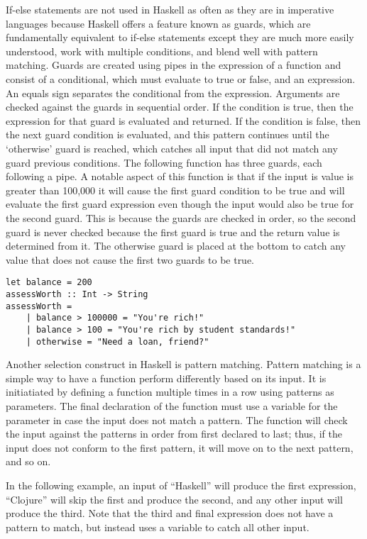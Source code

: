 \documentclass[titlepage,12pt]{article}
\begin{document}
If-else statements are not used in Haskell as often as they are in imperative languages because Haskell offers a feature 
known as guards, which are fundamentally equivalent to if-else statements except they are much more easily understood, 
work with multiple conditions, and blend well with pattern matching. Guards are created using pipes in the 
expression of a function and consist of a conditional, which must evaluate to true or false, and an expression. 
An equals sign separates the conditional from the expression. Arguments are checked against the guards in 
sequential order. If the condition is true, then the expression for that guard is evaluated and returned. 
If the condition is false, then the next guard condition is evaluated, and this pattern continues until the 
`otherwise' guard is reached, which catches all input that did not match any guard previous conditions. The 
following function has three guards, each following a pipe. A notable aspect of this function is that if the 
input is value is greater than 100,000 it will cause the first guard condition to be true and will evaluate the 
first guard expression even though the input would also be true for the second guard. This is because the guards are 
checked in order, so the second guard is never checked because the first guard is true and the return value is 
determined from it. The otherwise guard is placed at the bottom to catch any value that does not cause the first two guards to be true. 

\begin{verbatim}
let balance = 200
assessWorth :: Int -> String
assessWorth =
    | balance > 100000 = "You're rich!"
    | balance > 100 = "You're rich by student standards!"
    | otherwise = "Need a loan, friend?"
\end{verbatim}

Another selection construct in Haskell is pattern matching. Pattern matching is a simple way to have a 
function perform differently based on its input. It is initiatiated by defining a function multiple times in 
a row using patterns as parameters. The final declaration of the function must use a variable for the parameter 
in case the input does not match a pattern. The function will check the input against the patterns in order from 
first declared to last; thus, if the input does not conform to the first pattern, it will move on to the next pattern, and so on. 

In the following example, an input of ``Haskell'' will produce the first expression, ``Clojure'' will skip the first 
and produce the second, and any other input will produce the third. Note that the third and final expression does 
not have a pattern to match, but instead uses a variable to catch all other input. 
\end{document}
